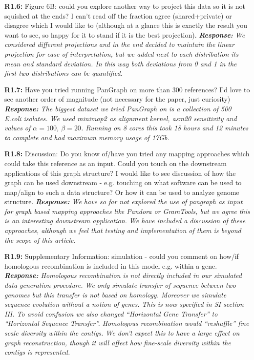 \documentclass[aps,rmp,onecolumn]{revtex4-1}
\newcommand{\reviewer}[2]{\textbf{#1:} #2\vskip 5mm}
\newcommand{\response}[1]{{\it {\color{response}\textbf{Response:} #1}}\vskip 5mm}
\newcommand{\SIsynthdata}{III}
\begin{document}
\reviewer{R1.6}{Figure 6B: could you explore another way to project this data so it is not squished at the ends? I can't read off the fraction agree (shared+private) or disagree which I would like to (although at a glance this is exactly the result you want to see, so happy for it to stand if it is the best projection).}
\response{We considered different projections and in the end decided to maintain the linear projection for ease of interpretation, but we added next to each distribution its mean and standard deviation. In this way both deviations from 0 and 1 in the first two distributions can be quantified.}

\reviewer{R1.7}{Have you tried running PanGraph on more than 300 references? I'd love to see another order of magnitude (not necessary for the paper, just curiosity)}
\response{The biggest dataset we tried PanGraph on is a collection of 500 E.coli isolates. We used minimap2 as alignment kernel, asm20 sensitivity and values of $\alpha = 100$, $\beta=20$. Running on 8 cores this took 18 hours and 12 minutes to complete and had maximum memory usage of 17Gb.}

\reviewer{R1.8}{Discussion: Do you know of/have you tried any mapping approaches which could take this reference as an input. Could you touch on the downstream applications of this graph structure? I would like to see discussion of how the graph can be used downstream - e.g. touching on what software can be used to map/align to such a data structure? Or how it can be used to analyze genome structure.}
\response{We have so far not explored the use of pangraph as input for graph based mapping approaches like Pandora or GramTools, but we agree this is an interesting downstream application. We have included a discussion of these approaches, although we feel that testing and implementation of them is beyond the scope of this article.}

\reviewer{R1.9}{Supplementary Information: simulation - could you comment on how/if homologous recombination is included in this model e.g. within a gene.}
\response{Homologous recombination is not directly included in our simulated data generation procedure. We only simulate transfer of sequence between two genomes but this transfer is not based on homology. Moreover we simulate sequence evolution without a notion of genes. This is now specified in SI section \SIsynthdata. To avoid confusion we also changed ``Horizontal Gene Transfer'' to ``Horizontal Sequence Transfer''. Homologous recombination would  ``reshuffle'' fine scale diversity within the contigs. We don't expect this to have a large effect on graph reconstruction, though it will affect how fine-scale diversity within the contigs is represented. }
\end{document}
